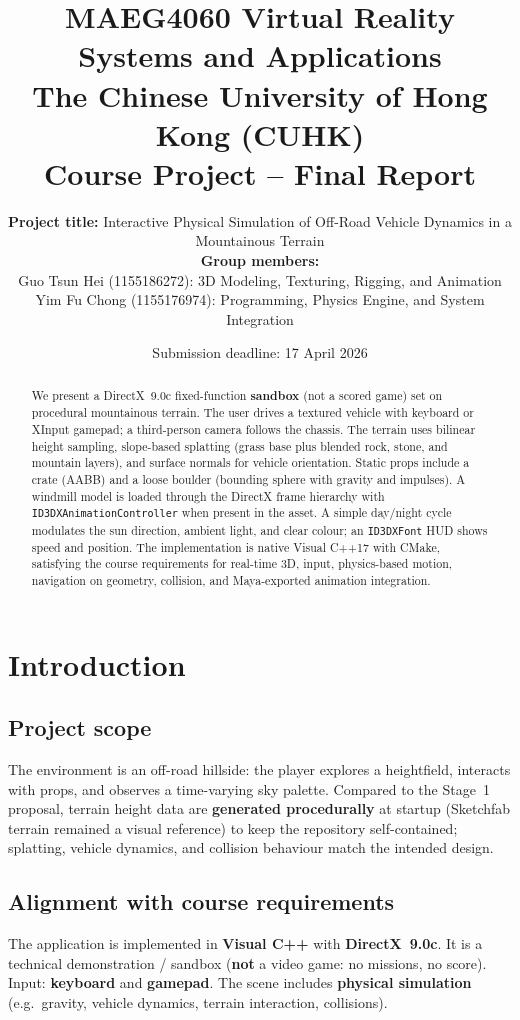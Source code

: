 \documentclass[11pt,a4paper]{article}
\title{%
  MAEG4060 Virtual Reality Systems and Applications\\
  \large The Chinese University of Hong Kong (CUHK)\\
  \large Course Project -- Final Report}
\author{%
  \parbox{0.92\linewidth}{\centering
  \textbf{Project title:} Interactive Physical Simulation of Off-Road Vehicle Dynamics in a Mountainous Terrain\\[0.75em]
  \textbf{Group members:}\\[0.35em]
  Guo Tsun Hei (1155186272): 3D Modeling, Texturing, Rigging, and Animation\\
  Yim Fu Chong (1155176974): Programming, Physics Engine, and System Integration}}
\date{Submission deadline: 17 April 2026}
\begin{document}
\maketitle

\begin{abstract}
\noindent
We present a DirectX~9.0c fixed-function \textbf{sandbox} (not a scored game) set on procedural mountainous terrain. The user drives a textured vehicle with keyboard or XInput gamepad; a third-person camera follows the chassis. The terrain uses bilinear height sampling, slope-based splatting (grass base plus blended rock, stone, and mountain layers), and surface normals for vehicle orientation. Static props include a crate (AABB) and a loose boulder (bounding sphere with gravity and impulses). A windmill model is loaded through the DirectX frame hierarchy with \texttt{ID3DXAnimationController} when present in the asset. A simple day/night cycle modulates the sun direction, ambient light, and clear colour; an \texttt{ID3DXFont} HUD shows speed and position. The implementation is native Visual C++17 with CMake, satisfying the course requirements for real-time 3D, input, physics-based motion, navigation on geometry, collision, and Maya-exported animation integration.
\end{abstract}

\tableofcontents
\newpage

\section{Introduction}
\label{sec:intro}

\subsection{Project scope}
The environment is an off-road hillside: the player explores a heightfield, interacts with props, and observes a time-varying sky palette. Compared to the Stage~1 proposal, terrain height data are \textbf{generated procedurally} at startup (Sketchfab terrain remained a visual reference) to keep the repository self-contained; splatting, vehicle dynamics, and collision behaviour match the intended design.

\subsection{Alignment with course requirements}
The application is implemented in \textbf{Visual C++} with \textbf{DirectX~9.0c}. It is a technical demonstration / sandbox (\textbf{not} a video game: no missions, no score). Input: \textbf{keyboard} and \textbf{gamepad}. The scene includes \textbf{physical simulation} (e.g.\ gravity, vehicle dynamics, terrain interaction, collisions).
\end{document}
